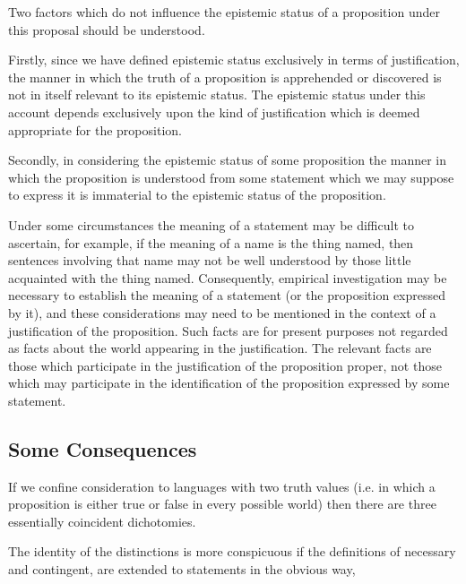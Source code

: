 Two factors which do not influence the epistemic status of a proposition under this proposal should be understood.

Firstly, since we have defined epistemic status exclusively in terms of justification, the manner in which the truth of a proposition is apprehended or discovered is not in itself relevant to its epistemic status.
The epistemic status under this account depends exclusively upon the kind of justification which is deemed appropriate for the proposition.

Secondly, in considering the epistemic status of some proposition the manner in which the proposition is understood from some statement which we may suppose to express it is immaterial to the epistemic status of the proposition.

Under some circumstances the meaning of a statement may be difficult to ascertain, for example, if the meaning of a name is the thing named, then sentences involving that name may not be well understood by those little acquainted with the thing named.
Consequently, empirical investigation may be necessary to establish the meaning of a statement (or the proposition expressed by it), and these considerations may need to be mentioned in the context of a justification of the proposition.
Such facts are for present purposes not regarded as facts about the world appearing in the justification.
The relevant facts are those which participate in the justification of the proposition proper, not those which may participate in the identification of the proposition expressed by some statement.

\subsection{Some Consequences}

If we confine consideration to languages with two truth values (i.e.
in which a proposition is either true or false in every possible world)
then there are three essentially coincident dichotomies.

The identity of the distinctions is more conspicuous if the definitions
of necessary and contingent, are extended to statements in the obvious
way,
